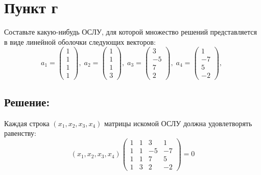 \documentclass[12pt]{article}
\begin{document}
    \section*{Пункт г}
    Составьте какую-нибудь ОСЛУ, для которой множество решений представляется в виде линейной оболочки следующих векторов:
    \[
        a_1 = \begin{pmatrix}
                  1 \\ 1 \\ 1 \\ 1
        \end{pmatrix}, \;
        a_2 = \begin{pmatrix}
                  1 \\ 1 \\ 1 \\ 3
        \end{pmatrix}, \;
        a_3 = \begin{pmatrix}
                  3 \\ -5 \\ 7 \\ 2
        \end{pmatrix}, \;
        a_4 = \begin{pmatrix}
                  1 \\ -7 \\ 5 \\ -2
        \end{pmatrix}, \;
    \]

    \subsection*{Решение:}
    Каждая строка $\left ( x_1, x_2, x_3, x_4 \right )$ матрицы искомой ОСЛУ должна удовлетворять равенству:
    \[
        \left ( x_1, x_2, x_3, x_4 \right )
        \begin{pmatrix}
            1 & 1 & 3  & 1  \\
            1 & 1 & -5 & -7 \\
            1 & 1 & 7  & 5  \\
            1 & 3 & 2  & -2
        \end{pmatrix}
        = 0
    \]
\end{document}
